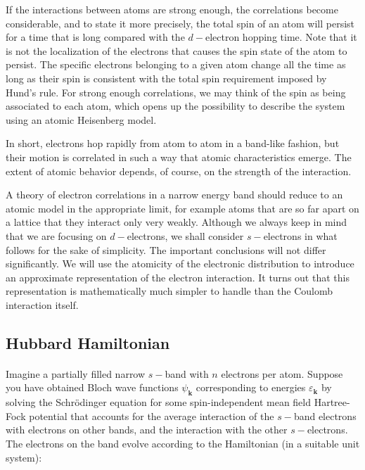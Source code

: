 \documentclass[10pt, twocolumn, twoside]{article}
\begin{document}
If the interactions between atoms are strong enough, the correlations become considerable, and to state it more precisely, the total spin of an atom will persist for a time that is long compared with the $d-$electron hopping time. Note that it is not the localization of the electrons that causes the spin state of the atom to persist. The specific electrons belonging to a given atom change all the time as long as their spin is consistent with the total spin requirement imposed by Hund's rule. For strong enough correlations, we may think of the spin as being associated to each atom, which opens up the possibility to describe the system using an atomic Heisenberg model.

In short, electrons hop rapidly from atom to atom in a band-like fashion, but their motion is correlated in such a way that atomic characteristics emerge. The extent of atomic behavior depends, of course, on the strength of the interaction.

A theory of electron correlations in a narrow energy band should reduce to an atomic model in the appropriate limit, for example atoms that are so far apart on a lattice that they interact only very weakly. Although we always keep in mind that we are focusing on $d-$electrons, we shall consider $s-$electrons in what follows for the sake of simplicity. The important conclusions will not differ significantly. We will use the atomicity of the electronic distribution to introduce an approximate representation of the electron interaction. It turns out that this representation is mathematically much simpler to handle than the Coulomb interaction itself.

\subsection{Hubbard Hamiltonian}\paragraph{}

Imagine a partially filled narrow $s-$band with $n$ electrons per atom. Suppose you have obtained Bloch wave functions $\psi_{\bm k}$ corresponding to energies $\varepsilon_{\bm k}$ by solving the Schr\"odinger equation for some spin-independent mean field Hartree-Fock potential that accounts for the average interaction of the $s-$band electrons with electrons on other bands, and the interaction with the other $s-$electrons. The electrons on the band evolve according to the Hamiltonian (in a suitable unit system):
\end{document}
